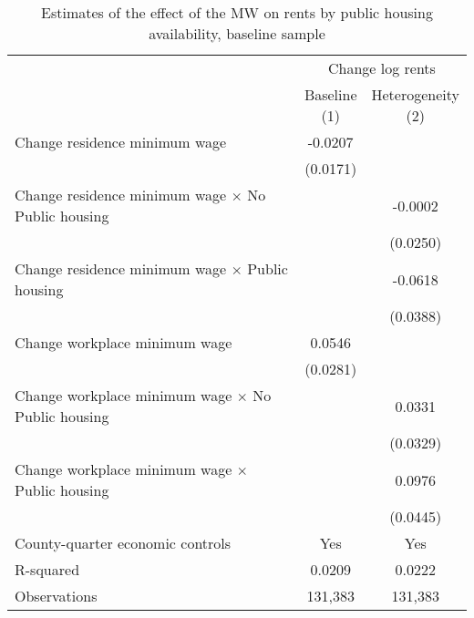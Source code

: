 \begin{table}[hbt!] \centering
    \caption{Estimates of the effect of the MW on rents by public housing availability, baseline sample}
    \label{tab:het_public_hous}
    \begin{tabular}{@{}lcc@{}}
        \toprule
            & \multicolumn{2}{c}{Change log rents}                                         \\ \cmidrule(l){2-3} 
            & \shortstack{Baseline \\(1)} 
            & \shortstack{Heterogeneity \\(2)}                                             \\ \midrule
        Change residence minimum wage                                     &  -0.0207   &       \\
                                                                          & (0.0171)  &       \\
        Change residence minimum wage $\times$ No Public housing          &        &  -0.0002  \\ 
                                                                          &        & (0.0250) \\   
        Change residence minimum wage $\times$ Public housing             &        &  -0.0618  \\
                                                                          &        & (0.0388) \\
        Change workplace minimum wage                                     &  0.0546   &       \\
                                                                          & (0.0281)  &       \\
        Change workplace minimum wage $\times$ No Public housing          &        &  0.0331  \\
                                                                          &        & (0.0329) \\
        Change workplace minimum wage $\times$ Public housing             &        &  0.0976  \\
                                                                          &        & (0.0445) \\
        County-quarter economic controls                                  &  Yes   &  Yes  \\
        R-squared                                                         &  0.0209   &  0.0222  \\
        Observations                                                      &  131,383  &  131,383 \\ \bottomrule
    \end{tabular}


\end{table}
